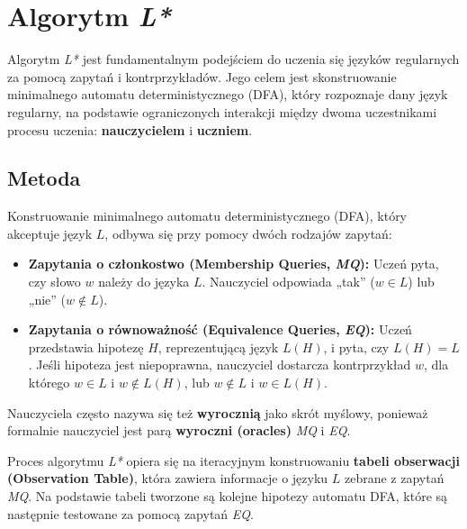\chapter{Algorytm \textit{L*}}
\label{cha:l-star}

Algorytm \textit{L*} \cite{L_STAR} jest fundamentalnym podejściem do uczenia się języków regularnych za pomocą zapytań i kontrprzykładów. Jego celem jest skonstruowanie minimalnego automatu deterministycznego (DFA), który rozpoznaje dany język regularny, na podstawie ograniczonych interakcji między dwoma uczestnikami procesu uczenia: \textbf{nauczycielem} i \textbf{uczniem}.

\section{Metoda}

Konstruowanie minimalnego automatu deterministycznego (DFA), który akceptuje język \( L \), odbywa się przy pomocy dwóch rodzajów zapytań:
\begin{itemize}
    \item \textbf{Zapytania o członkostwo (Membership Queries, \textit{MQ}):} Uczeń pyta, czy słowo \( w \) należy do języka \( L \). Nauczyciel odpowiada „tak” (\( w \in L \)) lub „nie” (\( w \notin L \)).
    \item \textbf{Zapytania o równoważność (Equivalence Queries, \textit{EQ}):} Uczeń przedstawia hipotezę \( H \), reprezentującą język \( L(H) \), i pyta, czy \( L(H) = L \). Jeśli hipoteza jest niepoprawna, nauczyciel dostarcza kontrprzykład \( w \), dla którego \( w \in L \) i \( w \notin L(H) \), lub \( w \notin L \) i \( w \in L(H) \).
\end{itemize}

Nauczyciela często nazywa się też \textbf{wyrocznią} jako skrót myślowy, ponieważ formalnie nauczyciel jest parą \textbf{wyroczni (oracles)} \textit{MQ} i \textit{EQ}.

Proces algorytmu \textit{L*} opiera się na iteracyjnym konstruowaniu \textbf{tabeli obserwacji (Observation Table)}, która zawiera informacje o języku \( L \) zebrane z zapytań \textit{MQ}. Na podstawie tabeli tworzone są kolejne hipotezy automatu DFA, które są następnie testowane za pomocą zapytań \textit{EQ}.

